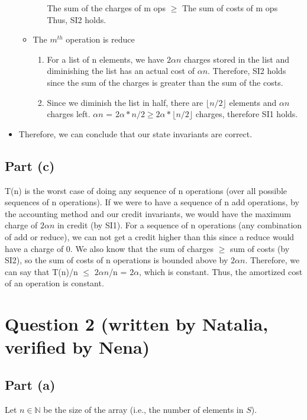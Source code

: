 \documentclass{article}
\begin{document}
\begin{itemize}
\begin{itemize}
\begin{enumerate}
                    The sum of the charges of m ops $\geq$ The sum of costs of m ops\\
                    Thus, SI2 holds.
                 \end{enumerate}
            \item The $m^{th}$ operation is reduce
                \begin{enumerate}
                    \item For a list of n elements, we have $2\alpha{n}$ charges stored in the list and diminishing the list has an actual cost of $\alpha{n}$. Therefore, SI2 holds since the sum of the charges is greater than the sum of the costs.
                    \item Since we diminish the list in half, there are $\lfloor{n/2}\rfloor$ elements and $\alpha{n}$ charges left. $\alpha{n}$  = $2\alpha * n/2 \geq 2\alpha * \lfloor{n/2}\rfloor$ charges, therefore SI1 holds.
                \end{enumerate}
        \end{itemize}
        \item Therefore, we can conclude that our state invariants are correct.
\end{itemize}

\subsection*{Part (c)}
T(n) is the worst case of doing any sequence of n operations (over all possible sequences of n operations). If we were to have a sequence of n add operations, by the accounting method and our credit invariants, we would have the maximum charge of $2\alpha{n}$ in credit (by SI1). For a sequence of n operations (any combination of add or reduce), we can not get a credit higher than this since a reduce would have a charge of 0. We also know that the sum of charges $\geq$ sum of costs (by SI2), so the sum of costs of n operations is bounded above by $2\alpha{n}$. Therefore, we can say that T(n)/n $\leq$ $2\alpha{n}$/n = $2\alpha$, which is constant. Thus, the amortized cost of an operation is constant.

\newpage
\section*{Question 2 (written by Natalia,  verified by Nena)}

\subsection*{Part (a)}
Let \( n \in \mathbb{N} \) be the size of the array (i.e., the number of elements in \( S \)).
\end{document}
